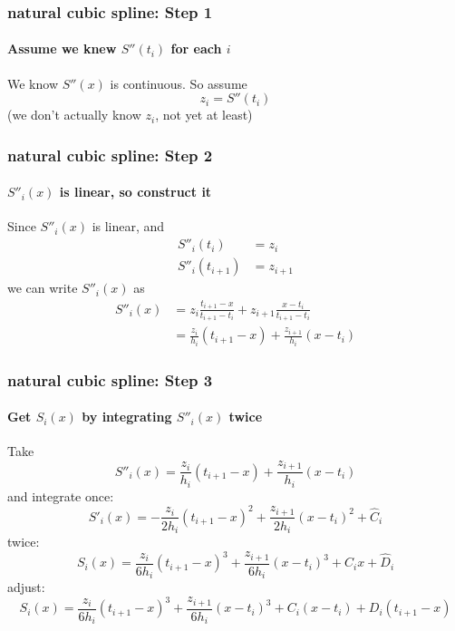 \documentclass[10pt]{beamer}
\begin{document}
\begin{frame}
\frametitle{natural cubic spline: Step 1}
\framesubtitle{Assume we knew $S''(t_i)$ for each $i$}
We know $S''(x)$ is continuous. So assume
\begin{equation*}
  z_i = S''(t_i) 
\end{equation*}
(we don't actually know $z_i$, not yet at least)
\end{frame}
\begin{frame}
\frametitle{natural cubic spline: Step 2}
\framesubtitle{$S''_i(x)$ is linear, so construct it}
Since $S''_i(x)$ is linear, and
\begin{align*}
  S''_i(t_i)&=z_i\\
  S''_i(t_{i+1})&=z_{i+1}
\end{align*}
we can write $S''_i(x)$ as
\begin{align*}
  S''_i(x) & = z_i     \frac{t_{i+1}-x}{t_{i+1}-t_{i}} + 
               z_{i+1} \frac{x-t_{i}}{t_{i+1}-t_{i}}\\
           & = \frac{z_i}{h_i}(t_{i+1}-x) +\frac{z_{i+1}}{h_i}(x-t_i)
\end{align*}

\end{frame}
\begin{frame}
\frametitle{natural cubic spline: Step 3}
\framesubtitle{Get $S_i(x)$ by integrating $S''_i(x)$ twice}
Take
\begin{equation*}
  S''_i(x) = \frac{z_i}{h_i}(t_{i+1}-x) +\frac{z_{i+1}}{h_i}(x-t_i)
\end{equation*}
and integrate once:
\begin{equation*}
  S'_i(x) = -\frac{z_i}{2h_i}(t_{i+1}-x)^2
+\frac{z_{i+1}}{2h_i}(x-t_i)^2 + \hat{C}_i
\end{equation*}
twice:
\begin{equation*}
  S_i(x) = \frac{z_i}{6h_i}(t_{i+1}-x)^3
+\frac{z_{i+1}}{6h_i}(x-t_i)^3 + \hat{C}_ix + \hat{D}_i
\end{equation*}
adjust:
\begin{equation*}
  S_i(x) = \frac{z_i}{6h_i}(t_{i+1}-x)^3
+\frac{z_{i+1}}{6h_i}(x-t_i)^3 + C_i(x-t_i) + D_i(t_{i+1}-x)
\end{equation*}
\end{frame}
\end{document}
